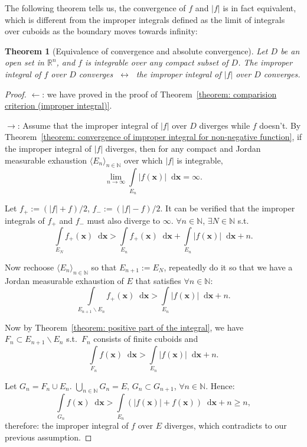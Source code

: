 \documentclass[openany]{book}
\theoremstyle{plain}
\newtheorem{theorem}{Theorem}[section] %
\theoremstyle{definition}
\newcommand{\dif}{\mathop{}\!\mathrm{d}} %
\newcommand*{\bv}{\boldsymbol} %
\newcommand*{\IFF}{\;\leftrightarrow\;} %
\begin{document}
The following theorem tells us, the convergence of $f$ and $|f|$ is in fact equivalent, which is different from the improper integrals defined as the limit of integrals over cuboids as the boundary moves towards infinity:
\begin{theorem}[Equivalence of convergence and absolute convergence]
	\label{theorem: equivalence of convergence and absolute convergence}
	Let $D$ be an open set in $\mathbb R^n$, and $f$ is integrable over any compact subset of $D$.
	The improper integral of $f$ over $D$ converges $\IFF$ the improper integral of $|f|$ over $D$ converges.
\end{theorem}
\begin{proof}
	$\gets$: we have proved in the proof of Theorem~\ref{theorem: comparision criterion (improper integral)}.

	$\to$: Assume that the improper integral of $|f|$ over $D$ diverges while $f$ doesn't. 
	By Theorem~\ref{theorem: convergence of improper integral for non-negative function}, if the improper integral of $|f|$ diverges, then for any compact and Jordan measurable exhaustion $\langle E_n \rangle_{n \in \mathbb N}$ over which $|f|$ is integrable, 
	\begin{equation*}
		\lim_{n \to \infty} \int\limits_{E_n} |f(\bv x)| \dif \bv x = \infty.
	\end{equation*}

	Let $f_+ := (|f| + f)/2$, $f_- := (|f| - f)/2$. 
	It can be verified that the improper integrals of $f_+$ and $f_-$ must also diverge to $\infty$. 
	$\forall n \in \mathbb N$, $\exists N \in \mathbb N$ s.t.\ 
	\begin{equation*}
		\int\limits_{E_N} f_+(\bv x) \dif \bv x > \int\limits_{E_n} f_+(\bv x) \dif \bv x + \int\limits_{E_n} |f(\bv x)| \dif \bv x + n.
	\end{equation*}

	Now rechoose $\langle E_n \rangle_{n \in \mathbb N}$ so that $E_{n+1} := E_N$, repeatedly do it so that we have a Jordan measurable exhaustion of $E$ that satisfies $\forall n \in \mathbb N$:
	\begin{equation*}
		\int\limits_{E_{n+1} \backslash E_n} f_+(\bv x) \dif \bv x > \int\limits_{E_n} |f(\bv x)| \dif \bv x + n.
	\end{equation*}

	Now by Theorem~\ref{theorem: positive part of the integral}, we have $F_n \subset E_{n+1} \backslash E_n$ s.t.\ $F_n$ consists of finite cuboids and
	\begin{equation*}
		\int\limits_{F_n} f(\bv x) \dif \bv x > \int\limits_{E_n} |f(\bv x)| \dif \bv x + n.
	\end{equation*}

	Let $G_n = F_n \cup E_n$. 
	$\bigcup_{n \in \mathbb N} G_n = E$, $G_n \subset G_{n+1}$, $\forall n \in \mathbb N$.
	Hence:
	\begin{equation*}
		\int\limits_{G_n} f(\bv x) \dif \bv x > \int\limits_{E_n} (|f(\bv x)| + f(\bv x)) \dif \bv x + n \geq n,
	\end{equation*}
	therefore: the improper integral of $f$ over $E$ diverges, which contradicts to our previous assumption.
\end{proof}
\end{document}
